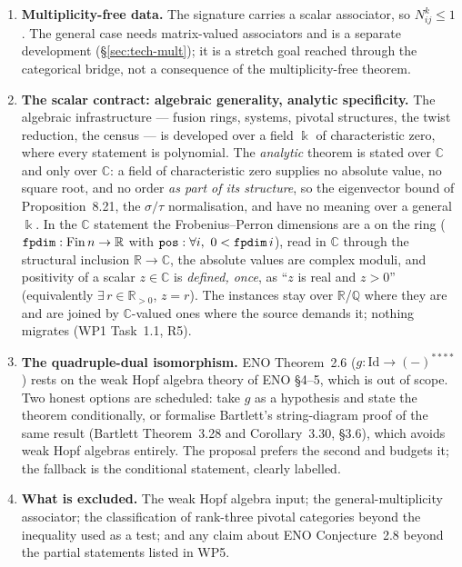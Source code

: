 \documentclass[11pt,a4paper]{article}
\theoremstyle{remark}
\newcommand{\code}[1]{\texttt{\detokenize{#1}}}
\newcommand{\Id}{\mathrm{Id}}
\newcommand{\field}{\Bbbk}
\newcommand{\R}{\mathbb{R}}
\newcommand{\Cx}{\mathbb{C}}
\newcommand{\Q}{\mathbb{Q}}
\begin{document}
\begin{enumerate}[label=(S\arabic*)]
\item \textbf{Multiplicity-free data.} The signature carries a scalar associator, so $N_{ij}^k
\le 1$. The general case needs matrix-valued associators and is a separate development
(\S\ref{sec:tech-mult}); it is a stretch goal reached through the categorical bridge, not a
consequence of the multiplicity-free theorem.
\item \textbf{The scalar contract: algebraic generality, analytic specificity.} The algebraic
infrastructure --- fusion rings, systems, pivotal structures, the twist reduction, the census ---
is developed over a field $\field$ of characteristic zero, where every statement is polynomial.
The \emph{analytic} theorem is stated over $\Cx$ and only over $\Cx$: a field of characteristic
zero supplies no absolute value, no square root, and no order \emph{as part of its structure}, so the eigenvector bound of
Proposition~8.21, the $\sigma/\tau$ normalisation, and \code{ENO823Exact} have no meaning over a
general $\field$. In the $\Cx$ statement the Frobenius--Perron dimensions are a
\code{FPData} on the ring ($\code{fpdim} : \mathrm{Fin}\,n \to \R$ with
$\code{pos} : \forall i,\ 0 < \code{fpdim}\, i$), read in $\Cx$ through the structural inclusion
$\R \to \Cx$, the absolute values are complex moduli, and positivity of a scalar $z \in \Cx$ is
\emph{defined, once}, as ``$z$ is real and $z > 0$'' (equivalently $\exists\, r \in \R_{>0}$,
$z = r$). The instances stay over $\R$/$\Q$ where they are and are joined by $\Cx$-valued ones
where the source demands it; nothing migrates (WP1 Task~1.1, R5).
\item \textbf{The quadruple-dual isomorphism.} ENO Theorem~2.6 ($g \colon \Id \to (-)^{****}$)
rests on the weak Hopf algebra theory of ENO \S4--5, which is out of scope. Two honest options
are scheduled: take $g$ as a hypothesis and state the theorem conditionally, or formalise
Bartlett's string-diagram proof of the same result (Bartlett Theorem~3.28 and Corollary~3.30,
\S3.6), which avoids weak Hopf algebras entirely. The proposal prefers the second and budgets
it; the fallback is the conditional statement, clearly labelled.
\item \textbf{What is excluded.} The weak Hopf algebra input; the general-multiplicity
associator; the classification of rank-three pivotal categories beyond the inequality used as a
test; and any claim about ENO Conjecture~2.8 beyond the partial statements listed in WP5.
\end{enumerate}
\end{document}
